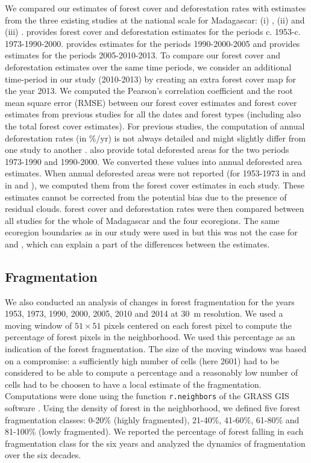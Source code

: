 \documentclass[a4paper, 12pt, leqno]{article}\usepackage[]{graphicx}\usepackage[]{color}
\begin{document}
We compared our estimates of forest cover and deforestation rates with
estimates from the three existing studies at the national scale for
Madagascar: (i) \citep{Harper2007}, (ii) \citep{MEFT2009} and (iii)
\citep{ONE2015}. \citet{Harper2007} provides forest cover and
deforestation estimates for the periods
c. 1953-c. 1973-1990-2000. \citet{MEFT2009} provides estimates for the
periods 1990-2000-2005 and \citet{ONE2015} provides estimates for the
periods 2005-2010-2013. To compare our forest cover and deforestation
estimates over the same time periods, we consider an additional
time-period in our study (2010-2013) by creating an extra forest cover
map for the year 2013. We computed the Pearson's correlation
coefficient and the root mean square error (RMSE) between our
forest cover estimates and forest cover estimates from previous
studies for all the dates and forest types (including also the total
forest cover estimates). For previous studies, the computation of
annual deforestation rates (in \%/yr) is not always detailed and might
slightly differ from one study to another
\citep[see][]{Puyravaud2003}. \citet{Harper2007} also provide total
deforested areas for the two periods 1973-1990 and 1990-2000. We
converted these values into annual deforested area estimates. When
annual deforested areas were not reported (for 1953-1973 in
\citet{Harper2007} and in \citet{MEFT2009} and \citet{ONE2015}), we
computed them from the forest cover estimates in each study. These
estimates cannot be corrected from the potential bias due to the
presence of residual clouds. forest cover and deforestation rates were
then compared between all studies for the whole of Madagascar and the
four ecoregions. The same ecoregion boundaries as in our study were
used in \citet{ONE2015} but this was not the case for
\citet{Harper2007} and \citet{MEFT2009}, which can explain a part of
the differences between the estimates.

\subsection{Fragmentation}

We also conducted an analysis of changes in forest fragmentation for
the years 1953, 1973, 1990, 2000, 2005, 2010 and 2014 at 30~m
resolution. We used a moving window of $51 \times 51$ pixels centered
on each forest pixel to compute the percentage of forest pixels in the
neighborhood. We used this percentage as an indication of the forest
fragmentation. The size of the moving windows was based on a
compromise: a sufficiently high number of cells (here 2601) had to be
considered to be able to compute a percentage and a reasonably low
number of cells had to be choosen to have a local estimate of the
fragmentation. Computations were done using the function
\texttt{r.neighbors} of the GRASS GIS software
\citep{Neteler2008}. Using the density of forest in the neighborhood,
we defined five forest fragmentation classes: 0-20\% (highly
fragmented), 21-40\%, 41-60\%, 61-80\% and 81-100\% (lowly
fragmented). We reported the percentage of forest falling in each
fragmentation class for the six years and analyzed the dynamics of
fragmentation over the six decades.
\end{document}
